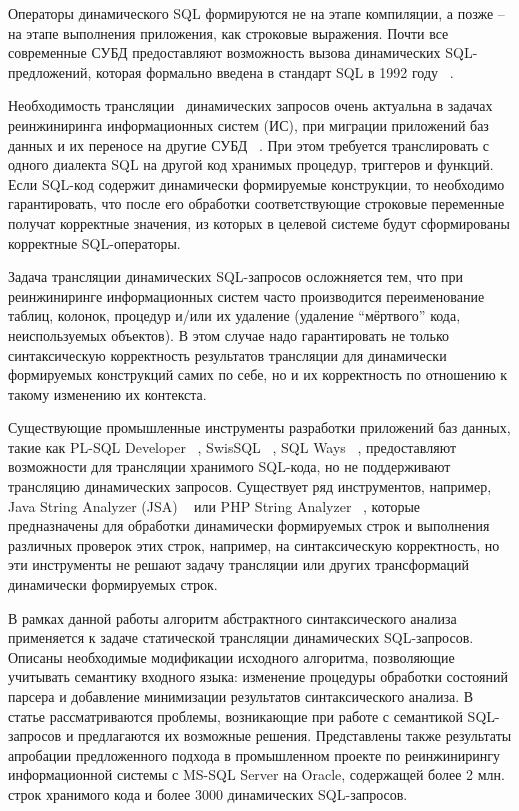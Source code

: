 \documentclass[a5paper]{article}
\begin{document}
Операторы динамического SQL формируются не на этапе компиляции, а позже -- на этапе выполнения приложения, как строковые выражения. Почти все современные СУБД предоставляют возможность вызова динамических SQL-предложений, которая формально введена в стандарт SQL в 1992 году ~\cite{ISO}.

Необходимость трансляции~\cite{mart} динамических запросов очень актуальна в задачах реинжиниринга информационных систем (ИС), при миграции приложений баз данных и их переносе на другие СУБД ~\cite{NetDbTransform}. При этом требуется транслировать с одного диалекта SQL на другой код хранимых процедур, триггеров и функций. Если SQL-код содержит  динамически формируемые конструкции, то необходимо гарантировать, что после его обработки соответствующие строковые переменные получат корректные значения, из которых в целевой системе будут сформированы корректные SQL-операторы.

Задача трансляции динамических SQL-запросов осложняется тем, что при реинжиниринге информационных систем часто производится переименование таблиц, колонок, процедур и/или их удаление (удаление “мёртвого” кода, неиспользуемых объектов). В этом случае надо гарантировать не только синтаксическую корректность результатов трансляции для динамически формируемых конструкций самих по себе, но и их корректность по отношению к такому изменению их контекста.

Существующие промышленные инструменты разработки приложений баз данных, такие как PL-SQL Developer ~\cite{PLSQL}, SwisSQL ~\cite{SwissSQL}, SQL Ways ~\cite{SQLWays}, предоставляют возможности для трансляции хранимого SQL-кода, но не поддерживают трансляцию динамических запросов. Существует ряд инструментов, например, Java String Analyzer (JSA) ~\cite{JSA} или PHP String Analyzer ~\cite{PHPSA}, которые предназначены для обработки динамически формируемых строк и выполнения различных проверок этих строк, например, на синтаксическую корректность, но эти инструменты не решают задачу трансляции или других трансформаций динамически формируемых строк.

В рамках данной работы алгоритм абстрактного синтаксического анализа ~\cite{AbstrParsing} применяется к задаче статической трансляции динамических SQL-запросов. Описаны необходимые модификации исходного алгоритма, позволяющие учитывать семантику входного языка: изменение процедуры обработки состояний парсера и добавление минимизации результатов синтаксического анализа. В статье рассматриваются проблемы, возникающие при работе с семантикой SQL-запросов и предлагаются их возможные решения. Представлены также результаты апробации предложенного подхода в промышленном проекте по реинжинирингу  информационной системы с MS-SQL Server на Oracle, содержащей более 2 млн. строк хранимого кода и более 3000 динамических SQL-запросов.
\end{document}
